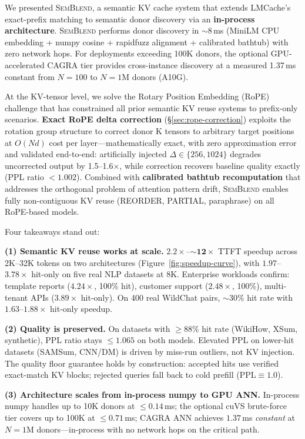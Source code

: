 \documentclass[10pt,twocolumn]{article}
\newcommand{\semblend}{\textsc{SemBlend}\xspace}
\begin{document}
We presented \semblend, a semantic KV cache system that extends
LMCache's exact-prefix matching to semantic donor discovery via an
\textbf{in-process architecture}. \semblend performs
donor discovery in ${\sim}8$\,ms (MiniLM CPU embedding +
numpy cosine + rapidfuzz alignment + calibrated bathtub) with zero
network hops. For deployments exceeding 100K donors, the optional
GPU-accelerated CAGRA tier provides cross-instance discovery at a
measured 1.37\,ms constant from $N{=}100$ to $N{=}1\text{M}$ donors (A10G).

At the KV-tensor level, we solve the Rotary Position Embedding (RoPE)
challenge that has constrained all prior semantic KV reuse systems to
prefix-only scenarios. \textbf{Exact RoPE delta correction}
(\S\ref{sec:rope-correction}) exploits the rotation group structure to
correct donor K tensors to arbitrary target positions at $O(Nd)$ cost
per layer---mathematically exact, with zero approximation error and
validated end-to-end: artificially injected $\Delta{\in}\{256,1024\}$
degrades uncorrected output by 1.5--1.6$\times$, while correction
recovers baseline quality exactly (PPL ratio $< 1.002$). Combined
with \textbf{calibrated bathtub recomputation} that addresses the
orthogonal problem of attention pattern drift, \semblend enables fully
non-contiguous KV reuse (REORDER, PARTIAL, paraphrase) on all
RoPE-based models.

Four takeaways stand out:

\textbf{(1) Semantic KV reuse works at scale.}
$\mathbf{2.2\times}$--$\mathbf{{\sim}12\times}$ TTFT
speedup across 2K--32K tokens on two architectures
(Figure~\ref{fig:speedup-curve}), with $1.97$--$3.78\times$ hit-only on
five real NLP datasets at 8K. Enterprise workloads confirm:
template reports ($4.24\times$, 100\% hit), customer support
($2.48\times$, 100\%), multi-tenant APIs ($3.89\times$ hit-only).
On 400 real WildChat pairs, ${\sim}30\%$ hit rate with
$1.63$--$1.88\times$ hit-only speedup.

\textbf{(2) Quality is preserved.}
On datasets with ${\geq}88\%$ hit rate (WikiHow, XSum, synthetic),
PPL ratio stays ${\leq}1.065$ on both models. Elevated PPL on
lower-hit datasets (SAMSum, CNN/DM) is driven by miss-run outliers,
not KV injection. The quality floor guarantee holds by construction:
accepted hits use verified exact-match KV blocks; rejected queries fall
back to cold prefill ($\text{PPL} \equiv 1.0$).

\textbf{(3) Architecture scales from in-process numpy to GPU ANN.}
In-process numpy handles up to 10K donors at ${\leq}0.14$\,ms;
the optional cuVS brute-force tier covers up to 100K at ${\leq}0.71$\,ms; CAGRA
ANN achieves $\mathbf{1.37}$\,ms \emph{constant} at $N{=}1\text{M}$
donors---in-process with no network hops on the critical path.
\end{document}
